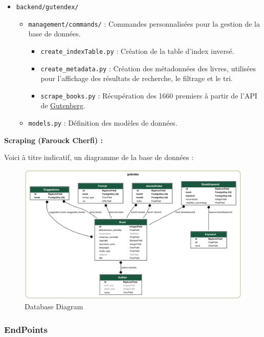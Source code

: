 \documentclass[
  12pt,
]{article}
\providecommand{\tightlist}{%
  \setlength{\itemsep}{0pt}\setlength{\parskip}{0pt}}
\begin{document}
\begin{itemize}
\tightlist
\item
  \texttt{backend/gutendex/}

  \begin{itemize}
  \tightlist
  \item
    \texttt{management/commands/} : Commandes personnalisées pour la
    gestion de la base de données.

    \begin{itemize}
    \tightlist
    \item
      \texttt{create\_indexTable.py} : Création de la table d'index
      inversé.
    \item
      \texttt{create\_metadata.py} : Création des métadonnées des
      livres, utilisées pour l'affichage des résultats de recherche, le
      filtrage et le tri.
    \item
      \texttt{scrape\_books.py} : Récupération des 1660 premiers à
      partir de l'API de \href{https://www.gutenberg.org/}{Gutenberg}.
    \end{itemize}
  \item
    \texttt{models.py} : Définition des modèles de données.
  \end{itemize}
\end{itemize}

\textbf{Scraping (Farouck Cherfi) : }

\newpage

Voici à titre indicatif, un diagramme de la base de données :

\begin{figure}
\centering
\includegraphics{../backend/db.png}
\caption{Database Diagram}
\end{figure}

\subsubsection{EndPoints}\label{endpoints}
\end{document}
